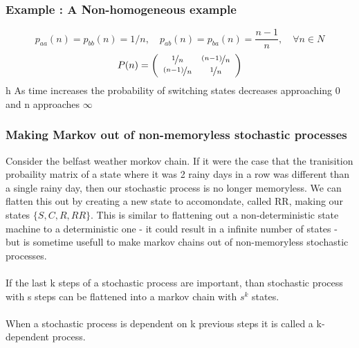 \documentclass{article}
\begin{document}
 	\subsubsection{Example : A Non-homogeneous example }
 	\[p_{aa}(n) = p_{bb}(n)= 1/n ,\quad p_{ab}(n) = p_{ba}(n) = \frac{n - 1}{n}, \quad \forall n \in N \]
 	\[ P(n) = \left( \begin{array}{cc}
            \nicefrac{1}{n} & \nicefrac{(n - 1)}{n}  \\
			\nicefrac{(n - 1)}{n} & \nicefrac{1}{n}  
	\end{array} \right)\]  
	h
	As time increases the probability of switching states decreases approaching 0 and n approaches \(\infty\)
	\subsubsection{Making Markov out of non-memoryless stochastic processes}
	Consider the belfast weather morkov chain. If it were the case that the tranisition probaility matrix of a state where it was 2 rainy days in a row was
	different than a single rainy day, then our stochastic process is no longer memoryless. We can flatten this out by creating a new state to accomondate, called
	RR, making our states $\{S,C,R,RR\}$. This is similar to flattening out a non-deterministic state machine to a deterministic one - it could result in a
	infinite number of states - but is sometime usefull to make markov chains out of non-memoryless stochastic processes. 
	\\
	\\If the last k steps of a stochastic process are important, than stochastic process with s steps can be flattened into a markov chain with $s^k$ states.
	\\
	\\When a stochastic process is dependent on k previous steps it is called a k-dependent process.  
\end{document}
